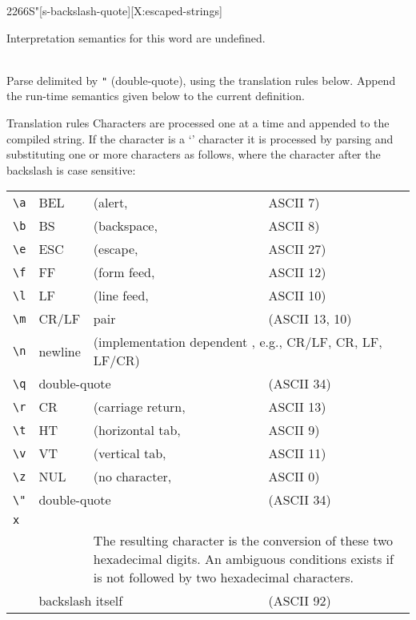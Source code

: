 
\begin{worddef}[Seq]{2266}{S\bs"}[s-backslash-quote][X:escaped-strings]

\interpret
	Interpretation semantics for this word are undefined.

\compile {} \\
	Parse  delimited by \verb|"| (double-quote), using the
	translation rules below. Append the run-time semantics given below to
	the current definition.

\item[Translation rules]
	Characters are processed one at a time and appended to the compiled
	string. If the character is a `\bs' character it is processed by
	parsing and substituting one or more \linebreak characters as follows, where
	the character after the backslash is case sensitive:

	\begin{tabular}{llll}
		\verb|\a|	& BEL		& (alert,		& ASCII 7) \\
		\verb|\b|	& BS		& (backspace,	& ASCII 8) \\
		\verb|\e|	& ESC		& (escape,		& ASCII 27) \\
		\verb|\f|	& FF		& (form feed,	& ASCII 12) \\
		\verb|\l|	& LF		& (line feed,	& ASCII 10) \\
		\verb|\m|	& CR/LF	& pair			& (ASCII 13, 10) \\
		\verb|\n|	& newline& \multicolumn{2}{l}{(implementation dependent , e.g., CR/LF, CR, LF, LF/CR)} \\
		\verb|\q|	& \multicolumn{2}{l}{double-quote} & (ASCII 34) \\
		\verb|\r|	& CR		& (carriage return,	& ASCII 13) \\
		\verb|\t|	& HT		& (horizontal tab,	& ASCII 9) \\
		\verb|\v|	& VT		& (vertical tab,		& ASCII 11) \\
		\verb|\z|	& NUL		& (no character,		& ASCII 0) \\
		\verb|\"|	& \multicolumn{2}{l}{double-quote} & (ASCII 34) \\
		\multicolumn{3}{l}{\texttt{\bs{}x}\arg{hexdigit}\arg{hexdigit}} \\
		&&\multicolumn{2}{p{27em}}{
			The resulting character is the conversion of these two hexadecimal
			digits. An ambiguous conditions exists if \texttt{\bs{x}} is not
			followed by two hexadecimal characters.} \\
		\texttt{\bs\bs} & \multicolumn{2}{l}{backslash itself} & (ASCII 92) \\
	\end{tabular}


\end{worddef}
